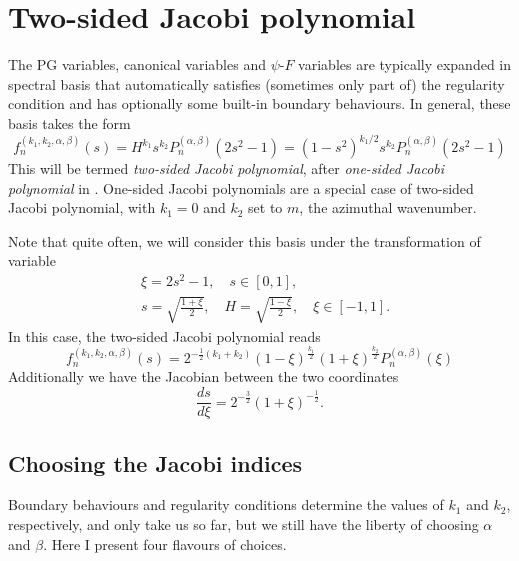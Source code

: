 \section{Two-sided Jacobi polynomial}

The PG variables, canonical variables and $\psi$-$F$ variables are typically expanded in spectral basis that automatically satisfies (sometimes only part of) the regularity condition and has optionally some built-in boundary behaviours. In general, these basis takes the form
%
\begin{equation}
    f_n^{(k_1, k_2, \alpha, \beta)}(s) = H^{k_1} s^{k_2} P_n^{(\alpha, \beta)}(2s^2 - 1) = (1 - s^2)^{k_1/2} s^{k_2} P_n^{(\alpha, \beta)}(2s^2 - 1)
\end{equation}
%
This will be termed \textit{two-sided Jacobi polynomial}, after \textit{one-sided Jacobi polynomial} in \citet{boyd_comparing_2011}. One-sided Jacobi polynomials are a special case of two-sided Jacobi polynomial, with $k_1 = 0$ and $k_2$ set to $m$, the azimuthal wavenumber.

Note that quite often, we will consider this basis under the transformation of variable
%
\begin{equation}\begin{aligned}
    &\xi = 2s^2 - 1,\quad s \in [0, 1],\\
    &s = \sqrt{\frac{1 + \xi}{2}},\quad H = \sqrt{\frac{1 - \xi}{2}},\quad \xi \in [-1, 1].
\end{aligned}\end{equation}
%
In this case, the two-sided Jacobi polynomial reads
%
\begin{equation}
    f_n^{(k_1, k_2, \alpha, \beta)}(s) = 2^{-\frac{1}{2}(k_1 + k_2)} (1 - \xi)^{\frac{k_1}{2}} (1 + \xi)^{\frac{k_2}{2}} P_n^{(\alpha, \beta)}(\xi)
\end{equation}
%
Additionally we have the Jacobian between the two coordinates
%
\begin{equation}
    \frac{ds}{d\xi} = 2^{-\frac{3}{2}} (1 + \xi)^{-\frac{1}{2}}.
\end{equation}

\subsection{Choosing the Jacobi indices}

Boundary behaviours and regularity conditions determine the values of $k_1$ and $k_2$, respectively, and only take us so far, but we still have the liberty of choosing $\alpha$ and $\beta$. Here I present four flavours of choices.

